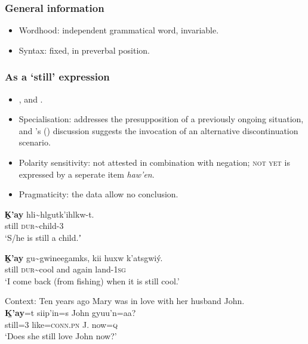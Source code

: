 \subsubsection{General information}
\begin{itemize}
	\item Wordhood: independent grammatical word, invariable.
	\item Syntax: fixed, in preverbal position.
\end{itemize}

\subsubsection{As a \lq{}still\rq{ }expression}
\begin{itemize}
	\item \textcite{Aonuki2021}, \textcite[445–447]{Tarpent1987} and \textcite[363–364]{Rigsby1986}.
	\item Specialisation: \textcite{Aonuki2021} addresses the presupposition of a previously ongoing situation, and  \citeauthor{Tarpent1987}'s (\citeyear{Tarpent1987}) discussion suggests the invocation of an alternative discontinuation scenario.
	\item Polarity sensitivity: not attested in combination with negation; \textsc{not yet} is expressed by a seperate item \textit{haw'en}.
	\item Pragmaticity: the data allow no conclusion.
\end{itemize}

\begin{exe}
	\ex
	\gll \textbf{K̠'ay}  hli\sim hlgutk'ihlkw-t.\\
	still \textsc{dur}\sim child-3\\
	\glt \lq S/he is still a child.ʼ \parencite[446]{Tarpent1987}

	\ex
	\gll \textbf{K̠'ay} gu\sim gwineegamks, kii huxw k'atsgwiý.\\
	still \textsc{dur}\sim cool and again land-1\textsc{sg}\\
	\glt \lq I come back (from fishing) when it is still cool.' \parencite[446]{Tarpent1987}

	\ex Context: Ten years ago Mary was in love with her husband John.\\
	\gll \textbf{Ḵ’ay}=t siip’in=s John gyuu’n=aa?\\
	still=3 like=\textsc{conn}.\textsc{pn} J. now=\textsc{q}\\
	\glt \lq Does she still love John now?’ \parencite[71]{Aonuki2021}
\end{exe}


